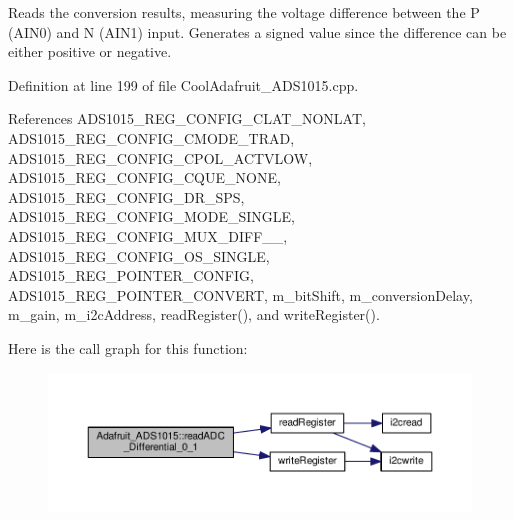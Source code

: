 Reads the conversion results, measuring the voltage difference between the P (A\+I\+N0) and N (A\+I\+N1) input. Generates a signed value since the difference can be either positive or negative. 



Definition at line 199 of file Cool\+Adafruit\+\_\+\+A\+D\+S1015.\+cpp.



References A\+D\+S1015\+\_\+\+R\+E\+G\+\_\+\+C\+O\+N\+F\+I\+G\+\_\+\+C\+L\+A\+T\+\_\+\+N\+O\+N\+L\+AT, A\+D\+S1015\+\_\+\+R\+E\+G\+\_\+\+C\+O\+N\+F\+I\+G\+\_\+\+C\+M\+O\+D\+E\+\_\+\+T\+R\+AD, A\+D\+S1015\+\_\+\+R\+E\+G\+\_\+\+C\+O\+N\+F\+I\+G\+\_\+\+C\+P\+O\+L\+\_\+\+A\+C\+T\+V\+L\+OW, A\+D\+S1015\+\_\+\+R\+E\+G\+\_\+\+C\+O\+N\+F\+I\+G\+\_\+\+C\+Q\+U\+E\+\_\+\+N\+O\+NE, A\+D\+S1015\+\_\+\+R\+E\+G\+\_\+\+C\+O\+N\+F\+I\+G\+\_\+\+D\+R\+\_\+S\+PS, A\+D\+S1015\+\_\+\+R\+E\+G\+\_\+\+C\+O\+N\+F\+I\+G\+\_\+\+M\+O\+D\+E\+\_\+\+S\+I\+N\+G\+LE, A\+D\+S1015\+\_\+\+R\+E\+G\+\_\+\+C\+O\+N\+F\+I\+G\+\_\+\+M\+U\+X\+\_\+\+D\+I\+F\+F\+\_\+\_, A\+D\+S1015\+\_\+\+R\+E\+G\+\_\+\+C\+O\+N\+F\+I\+G\+\_\+\+O\+S\+\_\+\+S\+I\+N\+G\+LE, A\+D\+S1015\+\_\+\+R\+E\+G\+\_\+\+P\+O\+I\+N\+T\+E\+R\+\_\+\+C\+O\+N\+F\+IG, A\+D\+S1015\+\_\+\+R\+E\+G\+\_\+\+P\+O\+I\+N\+T\+E\+R\+\_\+\+C\+O\+N\+V\+E\+RT, m\+\_\+bit\+Shift, m\+\_\+conversion\+Delay, m\+\_\+gain, m\+\_\+i2c\+Address, read\+Register(), and write\+Register().

Here is the call graph for this function\+:\nopagebreak
\begin{figure}[H]
\begin{center}
\leavevmode
\includegraphics[width=350pt]{df/df6/class_adafruit___a_d_s1015_a56582333958e66efaccd3d4a8a47e3ff_cgraph}
\end{center}
\end{figure}
\mbox{\label{class_adafruit___a_d_s1015_a38311881bcab46f7496c4bb6e4cad576}} 
